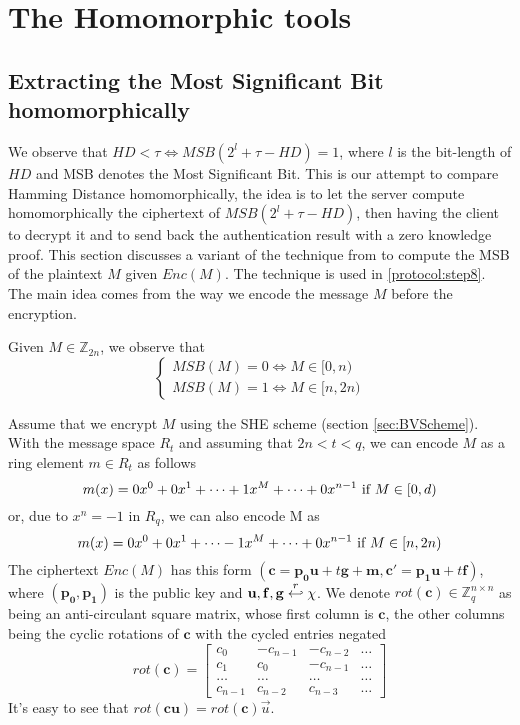 \section{The Homomorphic tools}
\subsection{Extracting the Most Significant Bit homomorphically}
\label{sec:MSBExtract}
We observe that \(HD < \tau \iff MSB(2^{l} + \tau - HD) = 1\), where \(l\) is
the bit-length of \(HD\) and MSB denotes the Most Significant Bit. This is our
attempt to compare Hamming Distance homomorphically, the idea is to let the
server compute homomorphically the ciphertext of \(MSB(2^{l} + \tau - HD)\),
then having the client to decrypt it and to send back the authentication result with a zero knowledge proof. This section discusses a variant of the technique from
\cite{ducas2015fhew} to compute the MSB of the plaintext $M$ given $Enc(M)$. The
technique is used in \ref{protocol:step8}. The main idea comes from the way we
encode the message $M$ before the encryption.

Given $M \in \mathbb{Z}_{2n}$, we observe that
\[
  \begin{cases}
    MSB(M) = 0 \iff M \in [0, n)\\
    MSB(M) = 1 \iff M \in [n, 2n)
  \end{cases}
\]

Assume that we encrypt $M$ using the SHE scheme (section
\ref{sec:BVScheme}). With the message space $R_t$ and assuming that $2n < t < q$,
we can encode $M$ as a ring element $m \in R_t$ as follows
\[
  m(x) = 0x^0 + 0x^1 + \dots + 1x^M + \dots + 0x^{n-1}
  \ \textnormal{if} \ M \in [0,d)
\]
or, due to $x^n = -1$ in $R_q$, we can also encode M as
\[
  m(x) = 0x^0 + 0x^1 + \dots - 1x^M + \dots + 0x^{n-1}
  \ \textnormal{if} \ M \in [n,2n)
\]
The ciphertext $Enc(M)$ has this form
$(\mathbf{c} = \mathbf{p_0}\mathbf{u} + t\mathbf{g} + \mathbf{m}, \mathbf{c'} =
\mathbf{p_1}\mathbf{u} + t\mathbf{f})$, where $(\mathbf{p_0}, \mathbf{p_1})$ is
the public key and $\mathbf{u}, \mathbf{f}, \mathbf{g} \stackrel{r}{\hookleftarrow} \chi$.  We
denote $ rot({\textbf{c}}) \in \mathbb{Z}_q^{n\times n}$ as being an anti-circulant
square matrix, whose first column is $\mathbf{c}$, the other columns being the
cyclic rotations of $\mathbf{c}$ with the cycled entries negated
\[
  rot({\mathbf{c}})=
  \begin{bmatrix}
    c_0 & -c_{n-1} & -c_{n-2} & \dots\\
    c_1 & c_0 & -c_{n-1} & \dots\\
    \dots & \dots & \dots & \dots\\
    c_{n-1} & c_{n-2} & c_{n-3} & \dots
  \end{bmatrix}
\]
It's easy to see that $rot(\mathbf{c}\mathbf{u}) = rot(\mathbf{c})
\vec{u}$.

